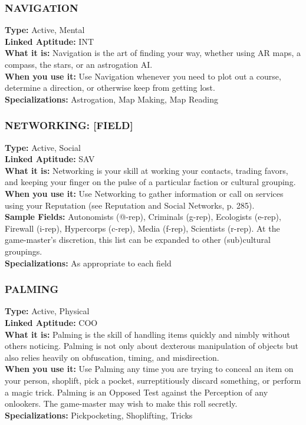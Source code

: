 \subsubsection{NAVIGATION} \textbf{Type:} Active, Mental \\ \textbf{Linked Aptitude:} INT \\ \textbf{What it is:} Navigation is the art of finding your way, whether using AR maps, a compass, the stars, or an astrogation AI. \\ \textbf{When you use it:} Use Navigation whenever you need to plot out a course, determine a direction, or otherwise keep from getting lost. \\ \textbf{Specializations:} Astrogation, Map Making, Map Reading 

\subsubsection{NETWORKING: [FIELD]} \textbf{Type:} Active, Social \\ \textbf{Linked Aptitude:} SAV \\ \textbf{What it is:} Networking is your skill at working your contacts, trading favors, and keeping your finger on the pulse of a particular faction or cultural grouping. \\ \textbf{When you use it:} Use Networking to gather information or call on services using your Reputation (see Reputation and Social Networks, p. 285). \\ \textbf{Sample Fields:} Autonomists (@-rep), Criminals (g-rep), Ecologists (e-rep), Firewall (i-rep), Hypercorps (c-rep), Media (f-rep), Scientists (r-rep). At the game-master’s discretion, this list can be expanded to other (sub)cultural groupings. \\ \textbf{Specializations:} As appropriate to each field 

\subsubsection{PALMING} \textbf{Type:} Active, Physical \\ \textbf{Linked Aptitude:} COO \\ \textbf{What it is:} Palming is the skill of handling items quickly and nimbly without others noticing. Palming is not only about dexterous manipulation of objects but also relies heavily on obfuscation, timing, and misdirection. \\ \textbf{When you use it:} Use Palming any time you are trying to conceal an item on your person, shoplift, pick a pocket, surreptitiously discard something, or perform a magic trick. Palming is an Opposed Test against the Perception of any onlookers. The game-master may wish to make this roll secretly. \\ \textbf{Specializations:} Pickpocketing, Shoplifting, Tricks 

